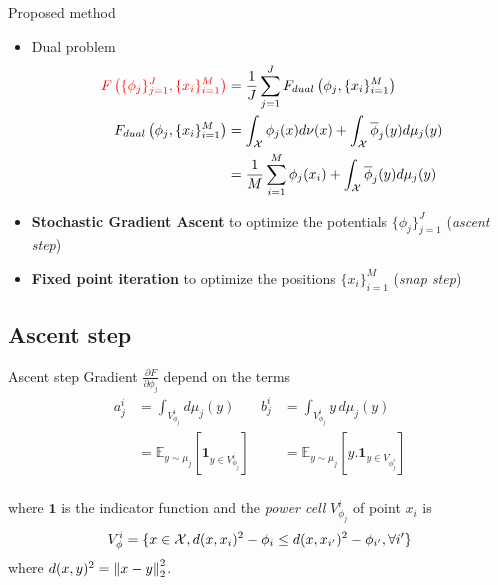 
\begin{frame}{Proposed method}
    \begin{itemize}
        \item Dual problem
            \begin{align*}
                 \textcolor{red}{F\left(\lbrace \phi_j\rbrace_{j=1}^J, \lbrace x_i \rbrace_{i=1}^M \right)} &= \frac{1}{J} \sum_{j=1}^{J} F_{dual}\left(\phi_j, \lbrace x_i \rbrace_{i=1}^M \right) \\
                F_{dual}\left(\phi_j, \lbrace x_i \rbrace_{i=1}^M\right) &= \int_{\mathcal{X}} \phi_j(x)d\nu(x) + \int_{\mathcal{X}} \overline{\phi}_j(y) d\mu_j(y) \\
                &= \frac{1}{M}\sum_{i=1}^{M} \phi_j(x_i) + \int_{\mathcal{X}} \overline{\phi}_j(y) d\mu_j(y) \\
            \end{align*}
        \item \textbf{Stochastic Gradient Ascent} to optimize the potentials $\lbrace \phi_j \rbrace_{j=1}^J$ (\textit{ascent step})
        \item \textbf{Fixed point iteration} to optimize the positions $\lbrace x_i \rbrace_{i=1}^M$ (\textit{snap step}) 
    \end{itemize}
\end{frame}

\subsection{Ascent step}
\begin{frame}{Ascent step}
Gradient $\frac{\partial F}{\partial \phi_j}$ depend on the terms 
\begin{align*}
    a^i_j &= \int_{V_{\phi_j}^i} d\mu_j(y) & b_j^i &= \int_{V_{\phi_j}^i} y\, d\mu_j(y) \\
     &= \mathbb{E}_{y \sim \mu_j}\left[ \mathbf{1}_{y\in V_{\phi_j}^i}\right] & & =\mathbb{E}_{y \sim \mu_j}\left[ y .  \mathbf{1}_{y\in V_{\phi_j^i}}\right] \\
\end{align*}

where $\mathbf{1}$ is the indicator function and the \textit{power cell} $V_{\phi_j}^i$ of point $x_i$ is
$$
V_{\phi}^i = \lbrace x\in\mathcal{X}, d(x, x_i)^2 - \phi_i \leq d(x, x_{i'})^2 - \phi_{i'}, \forall i'  \rbrace
$$
where $d(x, y)^2 = \left\lVert x-y\right\rVert_2^2$.

\end{frame}

